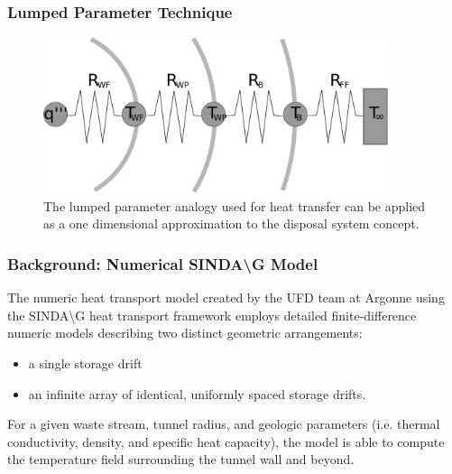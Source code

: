 \begin{frame}[ctb!]
  \frametitle{Lumped Parameter Technique}
  \begin{figure}[h!]
    \begin{center}
      \includegraphics[width=0.9\textwidth]{lumpedParam.eps}
    \end{center}
    \caption{The lumped parameter analogy used for heat transfer can be applied 
    as a one dimensional approximation to the disposal system concept. }
    \label{fig:lumpedParam}
  \end{figure}
\end{frame}



\begin{frame}[ctb!]
  \frametitle{Background: Numerical SINDA{\textbackslash}G Model}

  The numeric heat transport model created by the UFD team at Argonne
  using the SINDA{\textbackslash}G heat transport framework employs detailed finite-difference numeric  
  models describing two distinct geometric arrangements: 

  \begin{itemize}
  \item a single storage drift 
  \item an infinite array of identical, uniformly spaced  storage drifts.  
  \end{itemize}
  
  For a given waste stream, tunnel radius, and geologic parameters (i.e. thermal conductivity, density, and 
  specific heat capacity), the model is able to compute the temperature field 
  surrounding the tunnel wall and beyond.  
\end{frame}

